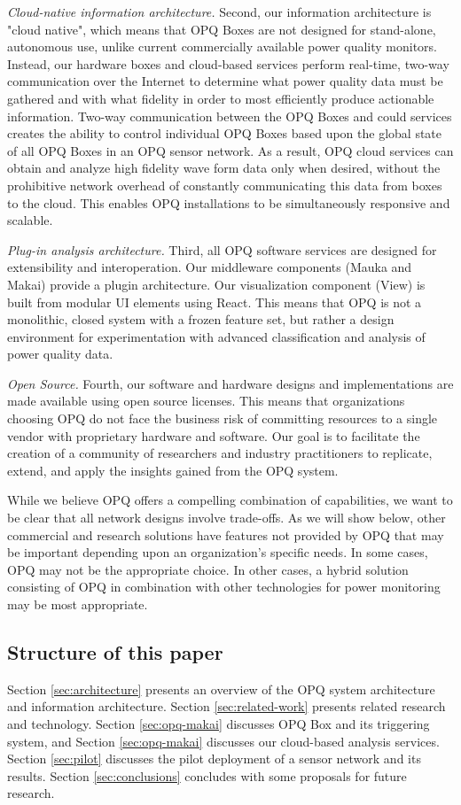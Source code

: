 {\em Cloud-native information architecture.} Second, our information architecture is "cloud native", which means that OPQ Boxes are not designed for stand-alone, autonomous use, unlike current commercially available power quality monitors. Instead, our hardware boxes and cloud-based services perform real-time, two-way communication over the Internet to determine what power quality data must be gathered and with what fidelity in order to most efficiently produce actionable information. Two-way communication between the OPQ Boxes and could services creates the ability to control individual OPQ Boxes based upon the global state of all OPQ Boxes in an OPQ sensor network. As a result, OPQ cloud services can obtain and analyze high fidelity wave form data only when desired, without the prohibitive network overhead of constantly communicating this data from boxes to the cloud. This enables OPQ installations to be simultaneously responsive and scalable.

{\em Plug-in analysis architecture.} Third, all OPQ software services are designed for extensibility and interoperation. Our middleware components (Mauka and Makai) provide a plugin architecture. Our visualization component (View) is built from modular UI elements using React.  This means that OPQ is not a monolithic, closed system with a frozen feature set, but rather a design environment for experimentation with advanced classification and analysis of power quality data.

{\em Open Source.} Fourth, our software and hardware designs and implementations are made available using open source licenses. This means that organizations choosing OPQ do not face the business risk of committing resources to a single vendor with proprietary hardware and software. Our goal is to facilitate the creation of a community of researchers and industry practitioners to replicate, extend, and apply the insights gained from the OPQ system.

While we believe OPQ offers a compelling combination of capabilities, we want to be clear that all network designs involve trade-offs. As we will show below, other commercial and research solutions have features not provided by OPQ that may be important depending upon an organization's specific needs. In some cases, OPQ may not be the appropriate choice. In other cases, a hybrid solution consisting of OPQ in combination with other technologies for power monitoring may be most appropriate.

\subsection{Structure of this paper}

Section \ref{sec:architecture} presents an overview of the OPQ system architecture and information architecture. Section \ref{sec:related-work} presents related research and technology.  Section \ref{sec:opq-makai} discusses OPQ Box and its triggering system, and Section \ref{sec:opq-makai} discusses our cloud-based analysis services. Section \ref{sec:pilot} discusses the pilot deployment of a sensor network and its results. Section \ref{sec:conclusions} concludes with some proposals for future research.


